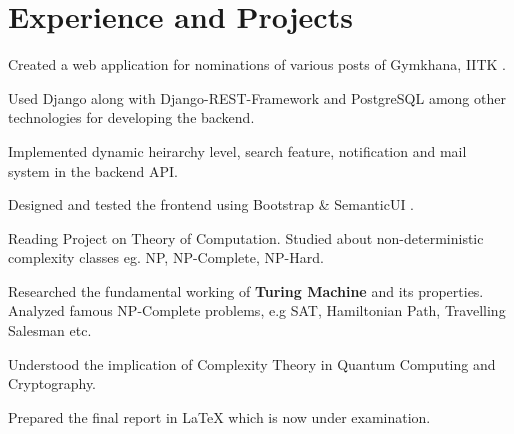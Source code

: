 \documentclass[]{deedy-resume-openfont}
\begin{document}
\hfill
\begin{minipage}[t]{0.66\textwidth} 


\section{Experience and Projects}
\vspace{0.4 cm}
\vspace{\topsep} %
\begin{tightemize}
  \item Created a web application for nominations of various posts of Gymkhana, IITK .
  \item Used Django along with Django-REST-Framework and PostgreSQL among other technologies for
    developing the backend.
  \item	Implemented dynamic heirarchy level, search feature, notification and mail system in the backend API. \\
  \item Designed and tested the frontend using Bootstrap \& SemanticUI .
\end{tightemize}
\vspace{0.2 cm}
\begin{tightemize}
  \item Reading Project on Theory of Computation. Studied about non-deterministic complexity classes eg. NP, NP-Complete, NP-Hard.
  \item Researched the fundamental working of \textbf{Turing Machine} and its properties. Analyzed famous NP-Complete problems, e.g SAT, Hamiltonian Path, Travelling Salesman etc. 
  \item Understood the implication of Complexity Theory in Quantum Computing and Cryptography.
  \item Prepared the final report in \LaTeX{} which is now under examination. 
\end{tightemize}
\vspace{1 cm}





\end{minipage}
\end{document}
